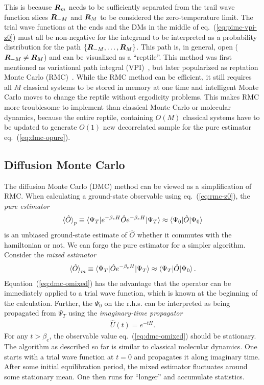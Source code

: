 This is because $\boldsymbol{R}_m$ needs to be sufficiently separated from the trail wave function slices $\boldsymbol{R}_{-M}$ and $\boldsymbol{R}_M$ to be considered the zero-temperature limit.
The trial wave functions at the ends and the DMs in the middle of eq.~(\ref{eq:pimc-vpi-z0}) must all be non-negative for the integrand to be interpreted as a probability distribution for the path $\{\boldsymbol{R}_{-M},\dots,\boldsymbol{R}_M\}$.
This path is, in general, open ($\boldsymbol{R}_{-M}\neq\boldsymbol{R}_M$) and can be visualized as a ``reptile''. This method was first mentioned as variational path integral (VPI)~\cite{Ceperley1995}, but later popularized as reptation Monte Carlo (RMC)~\cite{Baroni1999}.
While the RMC method can be efficient, it still requires all $M$ classical systems to be stored in memory at one time and intelligent Monte Carlo moves to change the reptile without ergodicity problems. This makes RMC more troublesome to implement than classical Monte Carlo or molecular dynamics, because the entire reptile, containing $O(M)$ classical systems have to be updated to generate $O(1)$ new decorrelated sample for the pure estimator eq.~(\ref{eq:dmc-opure}).

\subsection{Diffusion Monte Carlo} \label{sec:method-dmc}
The diffusion Monte Carlo (DMC) method can be viewed as a simplification of RMC.
When calculating a ground-state observable using eq.~(\ref{eq:rmc-z0}), the \emph{pure estimator}
\begin{align} \label{eq:dmc-opure}
\braket{\hat{O}}_p \equiv \braket{\Psi_T|e^{-\beta_e H}\hat{O}e^{-\beta_e H}|\Psi_T} \approx \braket{\Psi_0|\hat{O}|\Psi_0}
\end{align}
is an unbiased ground-state estimate of $\hat{O}$ whether it commutes with the hamiltonian or not. We can forgo the pure estimator for a simpler algorithm. Consider the \emph{mixed estimator}
\begin{align} \label{eq:dmc-omixed}
\braket{\hat{O}}_m \equiv \braket{\Psi_T|\hat{O}e^{-\beta_e H}|\Psi_T}\approx\braket{\Psi_T|\hat{O}|\Psi_0}.
\end{align}
Equation~(\ref{eq:dmc-omixed}) has the advantage that the operator can be immediately applied to a trial wave function, which is known at the beginning of the calculation. Further, the $\Psi_0$ on the r.h.s. can be interpreted as being propagated from $\Psi_T$ using the \emph{imaginary-time propagator}
\begin{align}
\hat{U}(t) = e^{-t H}.
\end{align}
For any $t>\beta_e$, the observable value eq.~(\ref{eq:dmc-omixed}) should be stationary. The algorithm as described so far is similar to classical molecular dynamics. One starts with a trial wave function at $t=0$ and propagates it along imaginary time. After some initial equilibration period, the mixed estimator fluctuates around some stationary mean. One then runs for ``longer'' and accumulate statistics.

